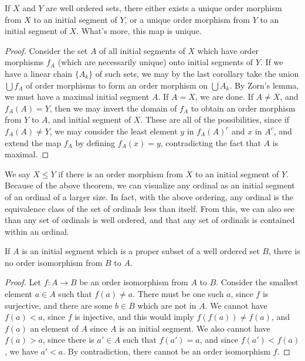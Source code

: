 \begin{lemma}
    If $X$ and $Y$ are well ordered sets, there either exists a unique order morphism from $X$ to an initial segment of $Y$, or a unique order morphism from $Y$ to an initial segment of $X$. What's more, this map is unique.
\end{lemma}
\begin{proof}
    Consider the set $A$ of all initial segments of $X$ which have order morphisms $f_A$ (which are necessarily unique) onto initial segments of $Y$. If we have a linear chain $\{A_k\}$ of such sets, we may by the last corollary take the union $\bigcup f_A$ of order morphisms to form an order morphism on $\bigcup A_k$. By Zorn's lemma, we must have a maximal initial segment $A$. If $A = X$, we are done. If $A \neq X$, and $f_A(A) = Y$, then we may invert the domain of $f_A$ to obtain an order morphism from $Y$ to $A$, and initial segment of $X$. These are all of the possibilities, since if $f_A(A) \neq Y$, we may consider the least element $y$ in $f_A(A)^c$ and $x$ in $A^c$, and extend the map $f_A$ by defining $f_A(x) = y$, contradicting the fact that $A$ is maximal.
\end{proof}

We say $X \leq Y$ if there is an order morphism from $X$ to an initial segment of $Y$. Because of the above theorem, we can visualize any ordinal as an initial segment of an ordinal of a larger size. In fact, with the above ordering, any ordinal is the equivalence class of the set of ordinals less than itself. From this, we can also see than any set of ordinals is well ordered, and that any set of ordinals is contained within an ordinal.

\begin{lemma}
    If $A$ is an initial segment which is a proper subset of a well ordered set $B$, there is no order isomorphism from $B$ to $A$.
\end{lemma}
\begin{proof}
    Let $f:A \to B$ be an order isomorphism from $A$ to $B$. Consider the smallest element $a \in A$ such that $f(a) \neq a$. There must be one such $a$, since $f$ is surjective, and there are some $b \in B$ which are not in $A$. We cannot have $f(a) < a$, since $f$ is injective, and this would imply $f(f(a)) \neq f(a)$, and $f(a)$ an element of $A$ since $A$ is an initial segment. We also cannot have $f(a) > a$, since there is $a' \in A$ such that $f(a') = a$, and since $f(a') < f(a)$, we have $a' < a$. By contradiction, there cannot be an order isomorphism $f$.
\end{proof}

